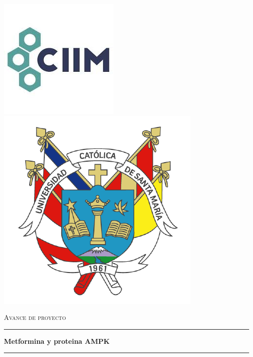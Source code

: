 \documentclass[a4paper,11pt,oneside]{book}
\numberwithin{equation}{section}
\begin{document}

\begin{titlepage}
\begin{center}

     \includegraphics[scale=0.49]{logo} \hfill
     \includegraphics[scale=0.25]{web-ucsm-escudo.png} \par

\textsc{\Large Avance de proyecto } \vspace{0.5cm} %

\rule{14cm}{0.05cm} \vspace{0.4cm} %

\Large{\textbf{Metformina y proteina AMPK }}\vspace{0.4cm} %

\rule{14cm}{0.05cm} \vspace{1.5cm} %
 

\end{center}
\end{titlepage}
\end{document}

